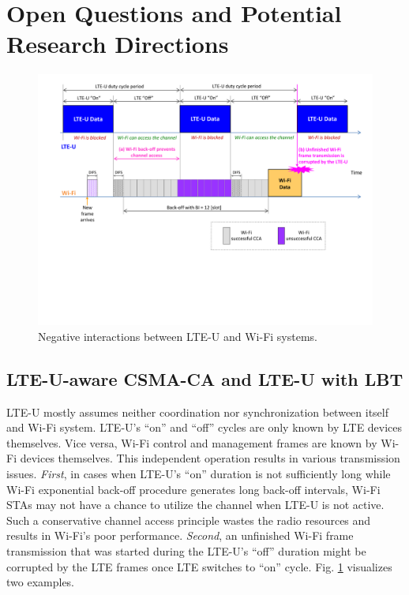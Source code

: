 \documentclass[journal,draftclsnofoot,12pt,onecolumn]{IEEEtran}
\begin{document}

\section{Open Questions and Potential Research Directions}
\label{sec:directions}

\begin{figure}[!t]
\centering
\includegraphics[width=1.0\columnwidth]{figures2/LTE-U-enhancement1}
\caption{Negative interactions between LTE-U and Wi-Fi systems.}
\label{figs:LTE-U-enhancement1}
\end{figure}

\subsection{LTE-U-aware CSMA-CA and LTE-U with LBT}
\label{subsection:LTE-U-aware}

LTE-U mostly assumes neither coordination nor synchronization between itself and Wi-Fi system. LTE-U's ``on'' and ``off'' cycles are only known by LTE devices themselves. Vice versa, Wi-Fi control and management frames are known by Wi-Fi devices themselves. This independent operation results in various transmission issues. \textit{First}, in cases when LTE-U's ``on'' duration is not sufficiently long while Wi-Fi exponential back-off procedure generates long back-off intervals, Wi-Fi STAs may not have a chance to utilize the channel when LTE-U is not active. Such a conservative channel access principle wastes the radio resources and results in Wi-Fi's poor performance. \textit{Second}, an unfinished Wi-Fi frame transmission that was started during the LTE-U's ``off'' duration might be corrupted by the LTE frames once LTE switches to ``on'' cycle. Fig. \ref{figs:LTE-U-enhancement1} visualizes two examples.
\end{document}

